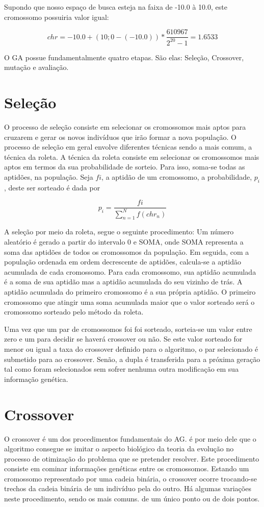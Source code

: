 \documentclass[
    12pt,               %
    twoside,            %
    a4paper,            %
    english,            %
    french,             %
    spanish,            %
    brazil,             %
    ]{abntex2}
\begin{document}
  Supondo que nosso espaço de busca esteja na faixa de -10.0 à 10.0, este cromossomo possuiria valor igual:

  $$chr = -10.0 + (10;0 - (-10.0))* \frac{610967}{2^{20}-1} = 1.6533 $$


  O GA possue fundamentalmente quatro etapas. São elas: Seleção, Crossover, mutação e avaliação.

\section{Seleção}
  O processo de seleção consiste em selecionar os cromossomos mais aptos para cruzarem e gerar os novos indivíduos que irão formar a nova população. O processo de seleção em geral envolve diferentes técnicas sendo a mais comum, a técnica da roleta.  A técnica da roleta consiste em selecionar os cromossomos mais aptos em termos da sua probabilidade de sorteio. Para isso, soma-se todas as aptidões, na população. Seja $fi$, a aptidão de um cromossomo, a probabilidade, 
  $p_i$, deste ser sorteado é dada por 

  $$p_i = \frac{fi}{\sum\limits_{n=1}^N f(chr_n)}$$


  A seleção por meio da roleta, segue o seguinte procedimento: Um número aleatório é gerado a partir do intervalo 0 e SOMA, onde SOMA representa a soma das aptidões de todos os cromossomos da população. Em seguida, com a população ordenada em ordem decrescente de aptidões, calcula-se a aptidão acumulada de cada cromossomo. Para cada cromossomo, sua aptidão acumulada é a soma de sua aptidão mas a aptidão acumulada do seu vizinho de trás. A aptidão acumulada do  primeiro cromossomo é a sua própria aptidão. O primeiro cromossomo que atingir uma soma acumulada maior que o valor sorteado será o cromossomo sorteado pelo método da roleta. 

  Uma vez que um par de cromossomos foi foi sorteado, sorteia-se um valor entre zero e um para decidir se haverá crossover ou não. Se este valor sorteado for menor ou igual a taxa do crossover definido para o algoritmo, o par selecionado é submetido para ao crossover. Senão, a dupla é transferida para a próxima geração tal como foram selecionados sem sofrer nenhuma outra modificação em sua informação genética.

\section{Crossover}
  
  O crossover é um dos procedimentos fundamentais do AG. é por meio dele que o algoritmo consegue se imitar o aspecto biológico da teoria da evolução no processo de otimização do problema que se pretender resolver. Este procedimento consiste em cominar informações genéticas entre os cromossomos. Estando um cromossomo representado por uma cadeia binária, o crossover ocorre trocando-se trechos da cadeia binária de um indivíduo pela do outro. Há algumas variações neste procedimento, sendo os mais comuns. de um único ponto ou de dois pontos.
\end{document}
